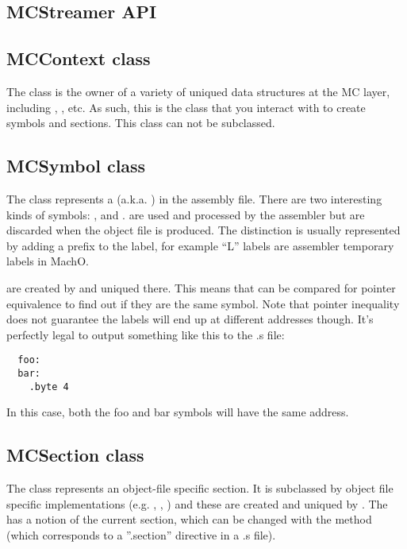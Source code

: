 \documentclass{myproc}
\begin{document}
\subsection{MCStreamer API}

\subsection{MCContext class}
The  class is the owner of a variety of uniqued data structures
at the MC layer, including , , etc. As such, this is
the class that you interact with to create symbols and sections. This class
can not be subclassed.

\subsection{MCSymbol class}
The  class represents a  (a.k.a. ) in the
assembly file. There are two interesting kinds of symbols: , and . 
 are used and processed by the assembler but
are discarded when the object file is produced. The distinction is usually
represented by adding a prefix to the label, for example ``L'' labels are
assembler temporary labels in MachO.  

 are created by  and uniqued there. This means that
 can be compared for pointer equivalence to find out if they are
the same symbol. Note that pointer inequality does not guarantee the labels will
end up at different addresses though. It’s perfectly legal to output something
like this to the .s file:
\begin{verbatim}
  foo:
  bar:
    .byte 4
\end{verbatim}
In this case, both the foo and bar symbols will have the same address.

\subsection{MCSection class}
The  class represents an object-file specific section. It is
subclassed by object file specific implementations (e.g. ,
, ) and these are created and uniqued by
. The  has a notion of the current section, which can be
changed with the  method (which corresponds to a ”.section”
directive in a .s file). 
\end{document}
